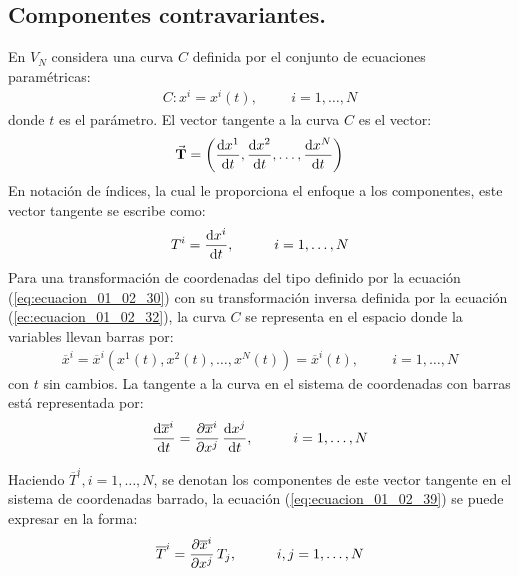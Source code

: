 \documentclass[hidelinks,12pt]{article}
\begin{document}
\subsection{Componentes contravariantes.}

En $V_{N}$ considera una curva $C$ definida por el conjunto de ecuaciones paramétricas:
\begin{align*}
C: x^{i} = x^{i} (t), \hspace{1cm} i = 1, \ldots, N
\end{align*}
donde $t$ es el parámetro. El vector tangente a la curva $C$ es el vector:
\begin{align*}
\va{T} = \left( \dv{x^{1}}{t}, \dv{x^{2}}{t}, \ldots, \dv{x^{N}}{t} \right)
\end{align*}
En notación de índices, la cual le proporciona el enfoque a los componentes, este vector tangente se escribe como:
\begin{align*}
T^{i} = \dv{x^{i}}{t}, \hspace{1cm} i = 1, \ldots, N
\end{align*}
Para una transformación de coordenadas del tipo definido por la ecuación (\ref{eq:ecuacion_01_02_30}) con su transformación inversa definida por la ecuación (\ref{ec:ecuacion_01_02_32}), la curva $C$ se representa en el espacio donde la variables llevan barras por:
\begin{align*}
\overline{x}^{i} = \overline{x}^{i} (x^{1} (t), x^{2} (t), \ldots, x^{N} (t)) = \overline{x}^{i} (t), \hspace{1cm} i = 1, \ldots, N
\end{align*}
con $t$ sin cambios. La tangente a la curva en el sistema de coordenadas con barras está representada por:
\begin{align}
\dv{\overline{x}^{i}}{t} = \pdv{\overline{x}^{i}}{x^{j}} \, \dv{x^{j}}{t}, \hspace{1cm} i = 1, \ldots, N
\label{eq:ecuacion_01_02_39}
\end{align}

Haciendo $\overline{T}^{i}, i = 1, \ldots, N$, se denotan los componentes de este vector tangente en el sistema de coordenadas barrado, la ecuación (\ref{eq:ecuacion_01_02_39}) se puede expresar en la forma:
\begin{align}
\overline{T}^{i} = \pdv{\overline{x}^{i}}{x^{j}} \, T_{j}, \hspace{1cm} i, j = 1, \ldots, N
\label{eq:ecuacion_01_02_40} 
\end{align}
\end{document}
